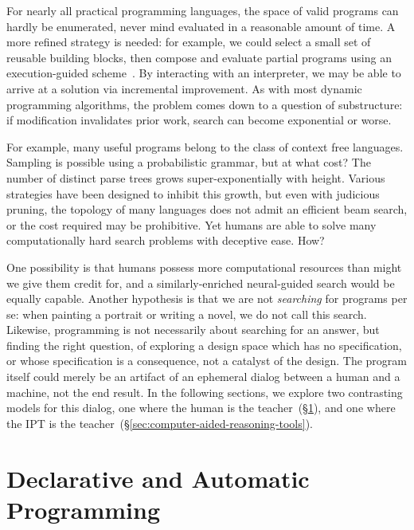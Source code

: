 \documentclass[10pt]{article}
\begin{document}
For nearly all practical programming languages, the space of valid programs can hardly be enumerated, never mind evaluated in a reasonable amount of time. A more refined strategy is needed: for example, we could select a small set of reusable building blocks, then compose and evaluate partial programs using an execution-guided scheme~\cite{chen2018execution, wang2018execution}. By interacting with an interpreter, we may be able to arrive at a solution via incremental improvement. As with most dynamic programming algorithms, the problem comes down to a question of substructure: if modification invalidates prior work, search can become exponential or worse.

For example, many useful programs belong to the class of context free languages. Sampling is possible using a probabilistic grammar, but at what cost? The number of distinct parse trees grows super-exponentially with height. Various strategies have been designed to inhibit this growth, but even with judicious pruning, the topology of many languages does not admit an efficient beam search, or the cost required may be prohibitive. Yet humans are able to solve many computationally hard search problems with deceptive ease. How?

One possibility is that humans possess more computational resources than might we give them credit for, and a similarly-enriched neural-guided search would be equally capable. Another hypothesis is that we are not \textit{searching} for programs per se: when painting a portrait or writing a novel, we do not call this search. Likewise, programming is not necessarily about searching for an answer, but finding the right question, of exploring a design space which has no specification, or whose specification is a consequence, not a catalyst of the design. The program itself could merely be an artifact of an ephemeral dialog between a human and a machine, not the end result. In the following sections, we explore two contrasting models for this dialog, one where the human is the teacher~(\S\ref{sec:automatic-and-declarative-programming}), and one where the IPT is the teacher~(\S\ref{sec:computer-aided-reasoning-tools}).

  \section{Declarative and Automatic Programming}\label{sec:automatic-and-declarative-programming}
\end{document}

